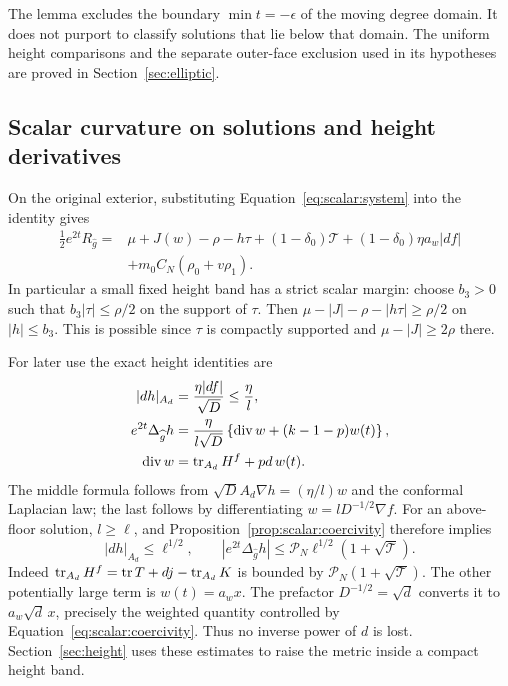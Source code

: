 The lemma excludes the boundary $\min t=-\epsilon$ of the moving
degree domain.  It does not purport to classify solutions that lie
below that domain.  The uniform height comparisons and the separate
outer-face exclusion used in its hypotheses are proved in
Section~\ref{sec:elliptic}.

\subsection{Scalar curvature on solutions and height derivatives}

On the original exterior, substituting
Equation~\eqref{eq:scalar:system} into the identity gives
\begin{equation}
 \begin{aligned}
 \frac12e^{2t}R_{\widehat g}
  ={}&\mu+J(w)-\rho-h\tau
       +(1-\delta_0)\mathcal T
       +(1-\delta_0)\eta a_w|df|\\
    &+m_0C_N(\rho_0+v\rho_1).
 \end{aligned}
 \label{eq:scalar:solution-curvature}
\end{equation}
In particular a small fixed height band has a strict scalar margin:
choose $b_3>0$ such that $b_3|\tau|\leq\rho/2$ on the support of
$\tau$.  Then $\mu-|J|-\rho-|h\tau|\geq\rho/2$ on
$|h|\leq b_3$.  This is possible since $\tau$ is compactly supported
and $\mu-|J|\geq2\rho$ there.

For later use the exact height identities are
\begin{equation}
 \begin{aligned}
 |dh|_{A_d}&=\frac{\eta|df|}{\sqrt D}\leq\frac\eta l,\\
 e^{2t}\Delta_{\widehat g}h
   &=\frac{\eta}{l\sqrt D}
       \left\{\operatorname{div} w+(k-1-p)w(t)\right\},\\
 \operatorname{div} w&=\operatorname{tr}_{A_d}H^f+pd\,w(t).
 \end{aligned}
 \label{eq:scalar:height-derivatives}
\end{equation}
The middle formula follows from
$\sqrt D A_d\nabla h=(\eta/l)w$ and the conformal Laplacian law;
the last follows by differentiating $w=lD^{-1/2}\nabla f$.
For an above-floor solution, $l\geq\ell$, and
Proposition~\ref{prop:scalar:coercivity} therefore implies
\begin{equation}
 |dh|_{A_d}\leq\ell^{1/2},\qquad
 |e^{2t}\Delta_{\widehat g}h|
                  \leq\mathcal P_N\ell^{1/2}(1+\sqrt{\mathcal T}).
 \label{eq:scalar:height-estimates}
\end{equation}
Indeed $\operatorname{tr}_{A_d}H^f=\operatorname{tr} T+dj-\operatorname{tr}_{A_d}K$ is bounded by
$\mathcal P_N(1+\sqrt{\mathcal T})$.  The other potentially large
term is $w(t)=a_wx$.  The prefactor $D^{-1/2}=\sqrt d$ converts it
to $a_w\sqrt d\,x$, precisely the weighted quantity controlled by
Equation~\eqref{eq:scalar:coercivity}.  Thus no inverse power of $d$
is lost.  Section~\ref{sec:height} uses these estimates to raise the
metric inside a compact height band.

